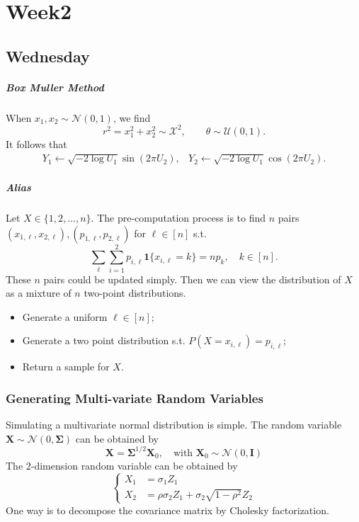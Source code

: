 
\chapter{Week2}

\section{Wednesday}

\paragraph{Box Muller Method}
When $x_1,x_2\sim \mathcal{N}(0,1)$, we find 
\[
r^2=x_1^2+x_2^2\sim\mathcal{X}^2,\qquad
\theta\sim\mathcal{U}(0,1).
\]
It follows that
\[
\begin{array}{ll}
Y_1\leftarrow \sqrt{-2\log U_1}\sin(2\pi U_2),
&
Y_2\leftarrow \sqrt{-2\log U_1}\cos(2\pi U_2).
\end{array}
\]


\paragraph{Alias}
Let $X\in\{1,2,\ldots,n\}$.
The pre-computation process is to find $n$ pairs $(x_{1,\ell},x_{2,\ell}), (p_{1,\ell},p_{2,\ell})$ for $\ell\in[n]$ s.t.
\[
\sum_{\ell}\sum_{i=1}^2p_{i,\ell}\bm1\{x_{i,\ell}=k\}
=
np_k,\quad
k\in[n].
\]
These $n$ pairs could be updated simply.
Then we can view the distribution of $X$ as a mixture of $n$ two-point distributions.
\begin{itemize}
\item
Generate a uniform $\ell\in[n]$;
\item
Generate a two point distribution s.t. $P(X=x_{i,\ell})=p_{i,\ell}$;
\item
Return a sample for $X$.
\end{itemize}

\subsection{Generating Multi-variate Random Variables}
Simulating a multivariate normal distribution is simple.
The random variable $\bm X\sim\mathcal{N}(0,\bm \Sigma)$ can be obtained by
\[
\bm X=\bm\Sigma^{1/2}\bm X_0,\quad
\mbox{with }\bm X_0\sim\mathcal{N}(0,\bm I)
\]
The $2$-dimension random variable can be obtained by
\[
\left\{
\begin{aligned}
X_1&=\sigma_1Z_1\\
X_2&=\rho \sigma_2Z_1 + \sigma_2\sqrt{1-\rho^2}Z_2
\end{aligned}
\right.
\]
One way is to decompose the covariance matrix by Cholesky factorization.


